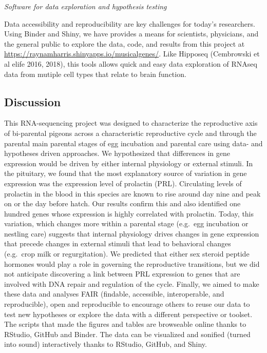 \emph{Software for data exploration and hypothesis testing}

Data accessibility and reproducibility are key challenges for today's
researchers. Using Binder and Shiny, we have provides a means for
scientists, physicians, and the general public to explore the data,
code, and results from this project at
\url{https://raynamharris.shinyapps.io/musicalgenes/}. Like Hipposeq
(Cembrowski et al elife 2016, 2018), this tools allows quick and easy
data exploration of RNAseq data from mutiple cell types that relate to
brain function.

\hypertarget{discussion}{%
\subsection{Discussion}\label{discussion}}

This RNA-sequencing project was designed to characterize the
reproductive axis of bi-parental pigeons across a characteristic
reproductive cycle and through the parental main parental stages of egg
incubation and parental care using data- and hypotheses driven
approaches. We hypothesized that differences in gene expression would be
driven by either internal physiology or external stimuli. In the
pituitary, we found that the most explanatory source of variation in
gene expression was the expression level of prolactin (PRL). Circulating
levels of prolactin in the blood in this species are known to rise
around day nine and peak on or the day before hatch. Our results confirm
this and also identified one hundred genes whose expression is highly
correlated with prolactin. Today, this variation, which changes more
within a parental stage (e.g.~egg incubation or nestling care) suggests
that internal physiology drives changes in gene expression that precede
changes in external stimuli that lead to behavioral changes (e.g.~crop
milk or regurgitation). We predicted that either sex steroid peptide
hormones would play a role in governing the reproductive transitions,
but we did not anticipate discovering a link between PRL expression to
genes that are involved with DNA repair and regulation of the cycle.
Finally, we aimed to make these data and analyses FAIR (findable,
accessible, interoperable, and reproducible), open and reproducible to
encourage others to reuse our data to test new hypotheses or explore the
data with a different perspective or toolset. The scripts that made the
figures and tables are browseable online thanks to RStudio, GitHub and
Binder. The data can be visualized and sonified (turned into sound)
interactively thanks to RStudio, GitHub, and Shiny.


